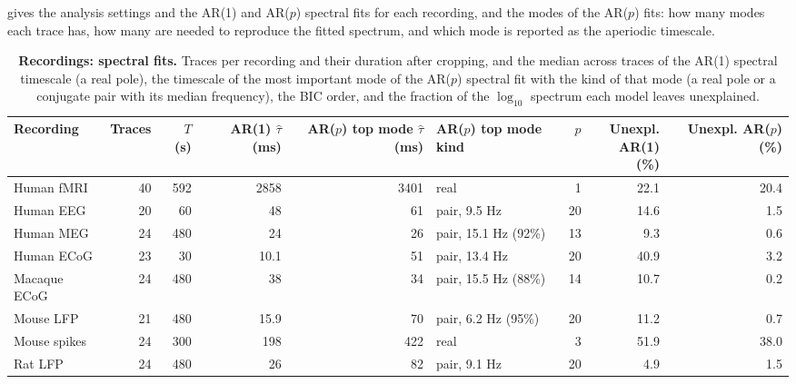 \documentclass[pdflatex,sn-mathphys-num]{sn-jnl}
\begin{document}
 gives the analysis settings and the AR(1) and AR($p$) spectral fits for each recording, and  the modes of the AR($p$) fits: how many modes each trace has, how many are needed to reproduce the fitted spectrum, and which mode is reported as the aperiodic timescale.

\begin{table}[h]
\caption{\textbf{Recordings: spectral fits.} Traces per recording and their duration after cropping, and the median across traces of the AR(1) spectral timescale (a real pole), the timescale of the most important mode of the AR($p$) spectral fit with the kind of that mode (a real pole or a conjugate pair with its median frequency), the BIC order, and the fraction of the $\log_{10}$ spectrum each model leaves unexplained.}\label{tab:s_recordings}
\setlength{\tabcolsep}{3pt}
\begin{tabular}{lrrrrlrrr}
\toprule
Recording & Traces & $T$ (s) & \shortstack[c]{AR(1) \\ $\hat\tau$ (ms)} & \shortstack[c]{AR($p$) top \\ mode $\hat\tau$ (ms)} & \shortstack[c]{AR($p$) top \\ mode kind} & $p$ & \shortstack[c]{Unexpl. \\ AR(1) (\%)} & \shortstack[c]{Unexpl. \\ AR($p$) (\%)} \\
\midrule
Human fMRI & 40 & 592 & 2858 & 3401 & real & 1 & 22.1 & 20.4 \\
Human EEG & 20 & 60 & 48 & 61 & pair, 9.5 Hz & 20 & 14.6 & 1.5 \\
Human MEG & 24 & 480 & 24 & 26 & pair, 15.1 Hz (92\%) & 13 & 9.3 & 0.6 \\
Human ECoG & 23 & 30 & 10.1 & 51 & pair, 13.4 Hz & 20 & 40.9 & 3.2 \\
Macaque ECoG & 24 & 480 & 38 & 34 & pair, 15.5 Hz (88\%) & 14 & 10.7 & 0.2 \\
Mouse LFP & 21 & 480 & 15.9 & 70 & pair, 6.2 Hz (95\%) & 20 & 11.2 & 0.7 \\
Mouse spikes & 24 & 300 & 198 & 422 & real & 3 & 51.9 & 38.0 \\
Rat LFP & 24 & 480 & 26 & 82 & pair, 9.1 Hz & 20 & 4.9 & 1.5 \\
\bottomrule
\end{tabular}
\end{table}
\end{document}
